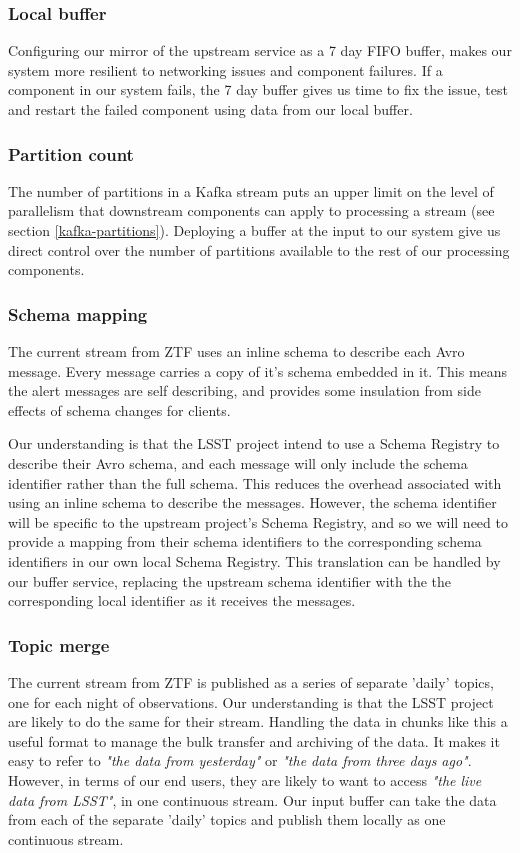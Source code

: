 \documentclass{article}
\newcommand{\avro} {Avro\xspace}
\newcommand{\kafka} {Kafka\xspace}
\newcommand{\schemaregistry} {Schema Registry\xspace}
\newcommand{\ztf} {ZTF\xspace}
\newcommand{\lsst} {LSST\xspace}
\begin{document}
\subsubsection{Local buffer}
\label{stage-1.local-buffer}
Configuring our mirror of the upstream service as a 7 day FIFO buffer, makes our system more resilient to networking issues and component failures.
If a component in our system fails, the 7 day buffer gives us time to fix the issue, test and restart the failed component using data from our local buffer.

\subsubsection{Partition count}
\label{stage-1.partition-count}
The number of partitions in a \kafka stream puts an upper limit on the level of parallelism that downstream components can apply to processing a stream (see section \ref{kafka-partitions}).
Deploying a buffer at the input to our system give us direct control over the number of partitions available to the rest of our processing components.

\subsubsection{Schema mapping}
\label{stage-1.schema-mapping}
The current stream from \ztf uses an inline schema to describe each \avro message.
Every message carries a copy of it's schema embedded in it.
This means the alert messages are self describing, and provides some insulation from side effects of schema changes for clients.

Our understanding is that the \lsst project intend to use a \schemaregistry to describe their \avro schema, and each message will only include the schema identifier rather than the full schema. This reduces the overhead associated with using an inline schema to describe the messages. However, the schema identifier will be specific to the upstream project's \schemaregistry, and so we will need to provide a mapping from their schema identifiers to the corresponding schema identifiers in our own local \schemaregistry.
This translation can be handled by our buffer service, replacing the upstream schema identifier with the the corresponding local identifier as it receives the messages.

\subsubsection{Topic merge}
\label{stage-1.topic-merge}
The current stream from \ztf is published as a series of separate 'daily' topics, one for each night of observations. Our understanding is that the \lsst project are likely to do the same for their stream.
Handling the data in chunks like this a useful format to manage the bulk transfer and archiving of the data. It makes it easy to refer to \textit{"the data from yesterday"} or \textit{"the data from three days ago"}. However, in terms of our end users, they are likely to want to access \textit{"the live data from \lsst"}, in one continuous stream.
Our input buffer can take the data from each of the separate 'daily' topics and publish them locally as one continuous stream.
\end{document}

